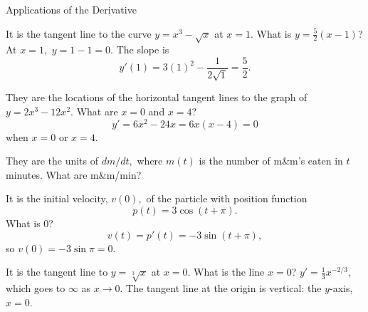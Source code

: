 \documentclass{article}
\begin{document}
\begin{category}{Applications of the Derivative}

  \begin{clue}[write]
    It is the tangent line to the curve
    $y = x^3 - \sqrt{x} $ at $x = 1.$
  \response
    What is $y = \frac{5}{2}(x - 1)$?
  \solution
    At $x = 1,$ $y = 1 - 1 = 0.$ The slope is
    \[ y'(1) = 3(1)^2 - \frac{1}{2\sqrt{1}} = \frac{5}{2}. \]
  \end{clue}

  \begin{clue}[say]
    They are the locations of the horizontal tangent lines to the graph of
    $ y = 2x^3 - 12x^2.$
  \response
    What are $x = 0$ and $x = 4$?
  \solution
    \[ y' = 6x^2 - 24x = 6x(x - 4) = 0 \]
    when $x = 0$ or $x = 4.$
  \end{clue}

  \begin{clue}[say]
    They are the units of $dm/dt,$ where $m(t)$ is the number of m\&m's
    eaten in $t$ minutes.
  \response
    What are m\&m/min?
  \end{clue}

  \begin{clue}[say]
    It is the initial velocity, $v(0),$ of the particle with position function
    \[ p(t) = 3\cos(t + \pi). \]
  \response
    What is $0$?
  \solution
    \[ v(t) = p'(t) = -3\sin(t + \pi), \]
    so $v(0) = -3\sin \pi = 0.$
  \end{clue}

  \begin{clue}[say]
    It is the tangent line to $y = \sqrt[3]{x}$ at $x = 0.$
  \response
    What is the line $x = 0$?
  \solution
    $y' = \frac{1}{3}x^{-2/3},$ which goes to $\infty$ as $x \to 0.$ The
    tangent line at the origin is vertical: the $y$-axis, $x = 0.$
  \end{clue}

\end{category}
\end{document}
